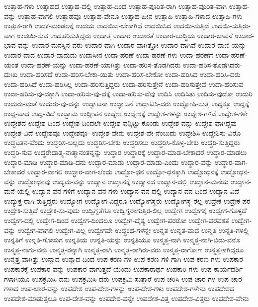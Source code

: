 {ಉತ್ಸಾಹ-ಗಳು
ಉತ್ಸಾಹದ
ಉತ್ಸಾಹ-ದಲ್ಲಿ
ಉತ್ಸಾಹ-ದಿಂದ
ಉತ್ಸಾಹ-ಪೂರಿತ-ರಾಗಿ
ಉತ್ಸಾಹ-ಪೂರಿತ-ವಾಗಿ
ಉತ್ಸಾಹ-ವನ್ನು
ಉತ್ಸಾಹ-ವಾಗಲಿ
ಉತ್ಸಾಹವೂ
ಉತ್ಸಾಹ-ವೇನೂ
ಉತ್ಸಾಹ-ಹೀನ
ಉತ್ಸಾಹಿ
ಉತ್ಸಾಹಿ-ಗಳಾದ
ಉತ್ಸಾಹಿ-ಗಳು
ಉತ್ಸುಕ-ರಾಗಿ
ಉದಕ-ಮಂಡಲಕ್ಕೆ
ಉದಯ
ಉದಯಿಸ-ಬೇಕಾಗಿದೆ
ಉದಯಿಸಿದ
ಉದಯಿ-ಸುತ್ತಿದೆ
ಉದಯಿ-ಸುತ್ತಿರು-ವಾಗ
ಉದಯಿ-ಸುವ
ಉದಹರಿಸುತ್ತಿದ್ದರು
ಉದಾತ್ತ
ಉದಾರ
ಉದಾರತೆ
ಉದಾರ-ಬುದ್ಧಿಯ
ಉದಾರ-ಭಾವನೆ
ಉದಾರ-ಭಾವ-ವನ್ನು
ಉದಾರ-ಮನಸ್ಸಿನ-ವರು
ಉದಾರ-ವಾಗಿ
ಉದಾರ-ವಾಗಿತ್ತೋ
ಉದಾರ-ವಾಗಿವೆ
ಉದಾರ-ವಾಣಿ-ಯನ್ನು
ಉದಾರ-ವಾದ
ಉದಾರ-ವಾದುದು
ಉದಾಸೀನ
ಉದಾ-ಹರಣೆ
ಉದಾ-ಹರಣೆ-ಗಳು
ಉದಾ-ಹರಣೆಗೆ
ಉದಾ-ಹರಣೆ-ಯಂತೆ
ಉದಾ-ಹರಣೆ-ಯನ್ನು
ಉದಾ-ಹರಣೆ-ಯಾಗಿತ್ತು
ಉದಾ-ಹರಿಸ-ತೊಡಗಿದರು
ಉದಾ-ಹರಿಸ-ತೊಡಗಿದರು-ದುಃಖ
ಉದಾ-ಹರಿಸದೆ
ಉದಾ-ಹರಿಸ-ಬೇಕಾ-ಯಿತು
ಉದಾ-ಹರಿಸ-ಬೇಕೋ
ಉದಾ-ಹರಿಸಿದ
ಉದಾ-ಹರಿಸಿ-ದರು
ಉದಾ-ಹರಿಸಿದೆ
ಉದಾ-ಹರಿಸಿಲ್ಲ
ಉದಾ-ಹರಿಸುತ್ತಿದ್ದರು
ಉದಾ-ಹರಿಸುತ್ತೇನೆ
ಉದಾ-ಹರಿಸುತ್ತೇವೆ
ಉದಾ-ಹರಿಸುವ
ಉದಾ-ಹರಿಸು-ವು-ದಕ್ಕಾಗಿ
ಉದಾ-ಹರಿಸು-ವು-ದಕ್ಕೆ
ಉದಾ-ಹರಿಸು-ವೆವು
ಉದಿಸಿ
ಉದಿಸಿತು
ಉದಿಸು-ವುದೋ
ಉದುರಿ
ಉದುರು-ವಂತೆ
ಉದುರು-ವು-ದನ್ನು
ಉದ್ಘಾಟನಾ
ಉದ್ಘಾಟನೆ
ಉದ್ಘಾಟಿಸಿ-ದರು
ಉದ್ಘೋಷಿ-ಸುತ್ತ
ಉದ್ದಕ್ಕೂ
ಉದ್ದಕ್ಕೆ
ಉದ್ದ-ವಾದ
ಉದ್ದ-ವಿದೆ
ಉದ್ದಾಮ
ಉದ್ದೀಪನ
ಉದ್ದೇಶ
ಉದ್ದೇಶಕ್ಕೆ
ಉದ್ದೇಶ-ಗಳನ್ನು
ಉದ್ದೇಶ-ಗಳಿವೆ
ಉದ್ದೇಶ-ಗಳೇ
ಉದ್ದೇಶದ
ಉದ್ದೇಶ-ದಿಂದ
ಉದ್ದೇಶ-ದಿಂದಲೇ
ಉದ್ದೇಶ-ವನ್ನಿಟ್ಟು-ಕೊಂಡು
ಉದ್ದೇಶ-ವನ್ನು
ಉದ್ದೇಶ-ವಾಗಿದ್ದವು
ಉದ್ದೇಶ-ವಿದೆ
ಉದ್ದೇಶವೂ
ಉದ್ದೇಶವೂ-
ಉದ್ದೇಶ-ವೇನು
ಉದ್ದೇಶ-ವೇ-ನೆಂಬುದು
ಉದ್ದೇಶಿಸಿ
ಉದ್ದೇಶಿಸು-ವಿರೊ
ಉದ್ಧಟತನ-ವೆಂದು
ಉದ್ಧರಿಸ-ಬಲ್ಲದು
ಉದ್ಧರಿಸ-ಬೇಕು
ಉದ್ಧರಿಸಲು
ಉದ್ಧರಿಸಿ-ಕೊಳ್ಳ-ಬೇಕು
ಉದ್ಧರಿ-ಸುತ್ತಿದ್ದರು
ಉದ್ಧರಿ-ಸುವ
ಉದ್ಧರೇದಾತ್ಮ-ನಾತ್ಮಾನಂತನ್ನನ್ನು
ಉದ್ಧಾರ
ಉದ್ಧಾರಕ್ಕೆ
ಉದ್ಧಾರ-ಮಾಡ-ಬೇಕಾದರೆ
ಉದ್ಧಾರ-ಮಾಡಲು
ಉದ್ಧಾರ-ಮಾಡಿ
ಉದ್ಧಾರ-ಮಾಡಿ-ದನು
ಉದ್ಧಾರ-ಮಾಡು
ಉದ್ಧಾರ-ಮಾಡು-ಎಂದು
ಉದ್ಧಾರ-ವನ್ನು
ಉದ್ಧಾರ-ವಾಗ-ಬೇಕಾದರೆ
ಉದ್ಧಾರ-ವಾಗಲಿ
ಉದ್ಧಾರ-ವಾಗ-ಲೆಂದು
ಉದ್ಬೋ-ಧನ
ಉದ್ಬೋ-ಧನಕ್ಕಾಗಿ
ಉದ್ಬೋಧನಕ್ಕೆ
ಉದ್ಬೋಧನ-ವನ್ನು
ಉದ್ಬೋಧನವು
ಉದ್ಯಮ-ವನ್ನು
ಉದ್ಯಾನ
ಉದ್ಯಾನಕ್ಕೆ
ಉದ್ಯಾನದ
ಉದ್ಯಾನ-ದಲ್ಲಿ
ಉದ್ಯಾನ-ಮನೆಯ
ಉದ್ಯಾನ-ಮನೆ-ಯಲ್ಲಿ
ಉದ್ಯಾನ-ವನ-ಗಳಿಗೆ
ಉದ್ಯಾನ-ವನ-ಗಳು
ಉದ್ಯಾನ-ವನ-ದಲ್ಲಿ
ಉದ್ಯಾನ-ವನ-ದಿಂದ
ಉದ್ಯಾನ-ವಿದೆ
ಉದ್ಯುಕ್ತ-ರಾಗಿ-ರುತ್ತಿದ್ದರು
ಉದ್ಯೋಗ
ಉದ್ಯೋಗ-ವಿದ್ದರೂ
ಉದ್ಯೋಗಸ್ಥರು
ಉದ್ಯೋಗಸ್ಥ-ರೆಲ್ಲ
ಉದ್ರೇಕ
ಉದ್ರೇಕ-ಪರ
ಉದ್ರೇಕಿ-ಸುತ್ತಿದೆ
ಉದ್ರೇಕಿ-ಸು-ವುದು
ಉದ್ವಿಗ್ನತೆಗೂ
ಉದ್ವಿಗ್ನರಾಗುತ್ತಿರ-ಲಿಲ್ಲ
ಉದ್ವೇಗ
ಉದ್ವೇಗಕ್ಕೆ
ಉದ್ವೇಗ-ಗೊಳ್ಳದೆ
ಉದ್ವೇಗ-ದಲ್ಲಿ
ಉದ್ವೇಗ-ದಿಂದ
ಉದ್ವೇಗ-ದಿಂದಲೂ
ಉದ್ವೇಗ-ದೈತ್ಯ
ಉದ್ವೇಗ-ಪರರೋ
ಉದ್ವೇಗ-ಪರವಶತೆ
ಉದ್ವೇಗ-ವನ್ನು
ಉದ್ವೇಗ-ವಾಗಲಿ
ಉದ್ವೇಗ-ವಿಲ್ಲ
ಉದ್ವೇಗವೇ
ಉದ್ಗ್ರಂಥ-ಗಳನ್ನೇ
ಉನ್ನತ
ಉನ್ನತ-ವಾದ
ಉನ್ನತಿ
ಉನ್ನತಿ-ಗಳಲ್ಲಿ
ಉನ್ನತಿಗೆ
ಉನ್ನತಿ-ಗೋಸುಗ
ಉನ್ನತಿಯ
ಉನ್ನತಿ-ಯನ್ನು
ಉನ್ನತಿಯೂ
ಉನ್ಮತ್ತ-ನಾಗಿ
ಉನ್ಮತ್ತ-ನಾಗಿ-ಬಿಡು-ವನೊ
ಉನ್ಮತ್ತ-ನಾಗು-ವನು
ಉನ್ಮತ್ತ-ರನ್ನಾಗಿ
ಉನ್ಮತ್ತ-ರಾಗಿ
ಉನ್ಮತ್ತ-ರಾಗಿರು-ವರು
ಉನ್ಮತ್ತ-ರಾಗೋಣ
ಉನ್ಮತ್ತಳಾಗಿದ್ದರೂ
ಉನ್ಮತ್ತ-ವಾಗಿತ್ತು
ಉನ್ಮಾದ
ಉನ್ಮಾದ-ದಿಂದ
ಉಪ-ಕರಣ-ಗಳ
ಉಪ-ಕರಣ-ಗಳಿ-ಗಾಗಿ
ಉಪ-ಕರಣ-ಗಳು
ಉಪಕಾರ
ಉಪಕಾರಕ್ಕೆ
ಉಪಕಾರ-ವನ್ನು
ಉಪಕಾರ-ವಾಗುತ್ತದೆ-ಯೆಂದು
ಉಪಕಾರಾರ್ಥ
ಉಪಕಾರಿ-ಗಳು
ಉಪ-ಕಾರ್ಯದರ್ಶಿ-ಗಳಾಗಿಯೂ
ಉಪಕ್ರಮಿಸಿ-ದನು
ಉಪಕ್ರಮಿಸಿ-ದರು
ಉಪಕ್ರಮಿ-ಸುತ್ತಾರೆ
ಉಪ-ಚರಿಸಿ
ಉಪ-ಚಾರ-ಗಳ
ಉಪ-ಚಾರ-ಗಳಾದ
ಉಪ-ಚಾರ-ವನ್ನು
ಉಪದೇಶ
ಉಪ-ದೇಶ-ಗಳನ್ನು
ಉಪ-ದೇಶ-ಗಳು
ಉಪದೇಶ-ಗಳೇನು
ಉಪದೇಶದ
ಉಪದೇಶ-ಮಾಡುತ್ತಲೂ
ಉಪ-ದೇಶ-ವನ್ನು
ಉಪದೇಶ-ವನ್ನೇ
ಉಪದೇಶ-ವಿತ್ತ
ಉಪದೇಶ-ವಿತ್ತರು
ಉಪದೇಶ-ವೇನು
}
